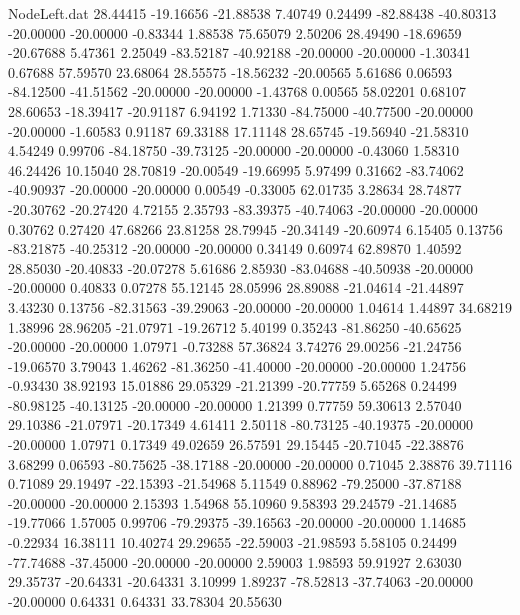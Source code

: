 \begin{filecontents}{NodeLeft.dat}
  28.44415  -19.16656  -21.88538     7.40749    0.24499  -82.88438  -40.80313  -20.00000  -20.00000   -0.83344    1.88538   75.65079    2.50206
  28.49490  -18.69659  -20.67688     5.47361    2.25049  -83.52187  -40.92188  -20.00000  -20.00000   -1.30341    0.67688   57.59570   23.68064
  28.55575  -18.56232  -20.00565     5.61686    0.06593  -84.12500  -41.51562  -20.00000  -20.00000   -1.43768    0.00565   58.02201    0.68107
  28.60653  -18.39417  -20.91187     6.94192    1.71330  -84.75000  -40.77500  -20.00000  -20.00000   -1.60583    0.91187   69.33188   17.11148
  28.65745  -19.56940  -21.58310     4.54249    0.99706  -84.18750  -39.73125  -20.00000  -20.00000   -0.43060    1.58310   46.24426   10.15040
  28.70819  -20.00549  -19.66995     5.97499    0.31662  -83.74062  -40.90937  -20.00000  -20.00000    0.00549   -0.33005   62.01735    3.28634
  28.74877  -20.30762  -20.27420     4.72155    2.35793  -83.39375  -40.74063  -20.00000  -20.00000    0.30762    0.27420   47.68266   23.81258
  28.79945  -20.34149  -20.60974     6.15405    0.13756  -83.21875  -40.25312  -20.00000  -20.00000    0.34149    0.60974   62.89870    1.40592
  28.85030  -20.40833  -20.07278     5.61686    2.85930  -83.04688  -40.50938  -20.00000  -20.00000    0.40833    0.07278   55.12145   28.05996
  28.89088  -21.04614  -21.44897     3.43230    0.13756  -82.31563  -39.29063  -20.00000  -20.00000    1.04614    1.44897   34.68219    1.38996
  28.96205  -21.07971  -19.26712     5.40199    0.35243  -81.86250  -40.65625  -20.00000  -20.00000    1.07971   -0.73288   57.36824    3.74276
  29.00256  -21.24756  -19.06570     3.79043    1.46262  -81.36250  -41.40000  -20.00000  -20.00000    1.24756   -0.93430   38.92193   15.01886
  29.05329  -21.21399  -20.77759     5.65268    0.24499  -80.98125  -40.13125  -20.00000  -20.00000    1.21399    0.77759   59.30613    2.57040
  29.10386  -21.07971  -20.17349     4.61411    2.50118  -80.73125  -40.19375  -20.00000  -20.00000    1.07971    0.17349   49.02659   26.57591
  29.15445  -20.71045  -22.38876     3.68299    0.06593  -80.75625  -38.17188  -20.00000  -20.00000    0.71045    2.38876   39.71116    0.71089
  29.19497  -22.15393  -21.54968     5.11549    0.88962  -79.25000  -37.87188  -20.00000  -20.00000    2.15393    1.54968   55.10960    9.58393
  29.24579  -21.14685  -19.77066     1.57005    0.99706  -79.29375  -39.16563  -20.00000  -20.00000    1.14685   -0.22934   16.38111   10.40274
  29.29655  -22.59003  -21.98593     5.58105    0.24499  -77.74688  -37.45000  -20.00000  -20.00000    2.59003    1.98593   59.91927    2.63030
  29.35737  -20.64331  -20.64331     3.10999    1.89237  -78.52813  -37.74063  -20.00000  -20.00000    0.64331    0.64331   33.78304   20.55630

\end{filecontents}
